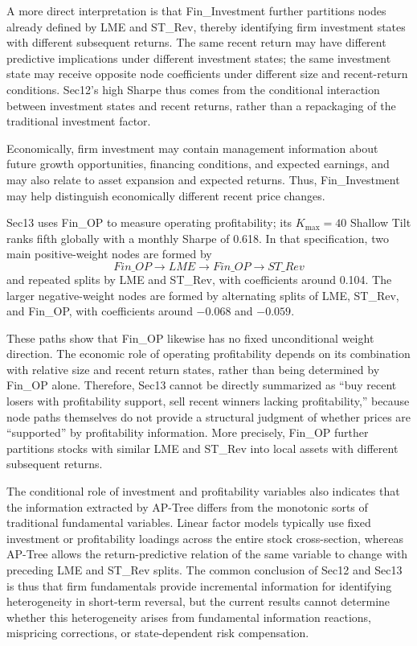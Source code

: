 \documentclass[12pt]{article}
\def\text#1{#1}%
\begin{document}
A more direct interpretation is that Fin\_Investment further partitions nodes already defined by LME and ST\_Rev, thereby identifying firm investment states with different subsequent returns. The same recent return may have different predictive implications under different investment states; the same investment state may receive opposite node coefficients under different size and recent-return conditions. Sec12's high Sharpe thus comes from the conditional interaction between investment states and recent returns, rather than a repackaging of the traditional investment factor.

Economically, firm investment may contain management information about future growth opportunities, financing conditions, and expected earnings, and may also relate to asset expansion and expected returns. Thus, Fin\_Investment may help distinguish economically different recent price changes.

Sec13 uses Fin\_OP to measure operating profitability; its \(K_{\max}=40\) Shallow Tilt ranks fifth globally with a monthly Sharpe of 0.618. In that specification, two main positive-weight nodes are formed by
\[
\text{Fin\_OP}\rightarrow\text{LME}\rightarrow
\text{Fin\_OP}\rightarrow\text{ST\_Rev}
\]
and repeated splits by LME and ST\_Rev, with coefficients around 0.104. The larger negative-weight nodes are formed by alternating splits of LME, ST\_Rev, and Fin\_OP, with coefficients around \(-0.068\) and \(-0.059\).

These paths show that Fin\_OP likewise has no fixed unconditional weight direction. The economic role of operating profitability depends on its combination with relative size and recent return states, rather than being determined by Fin\_OP alone. Therefore, Sec13 cannot be directly summarized as ``buy recent losers with profitability support, sell recent winners lacking profitability,'' because node paths themselves do not provide a structural judgment of whether prices are ``supported'' by profitability information. More precisely, Fin\_OP further partitions stocks with similar LME and ST\_Rev into local assets with different subsequent returns.

The conditional role of investment and profitability variables also indicates that the information extracted by AP-Tree differs from the monotonic sorts of traditional fundamental variables. Linear factor models typically use fixed investment or profitability loadings across the entire stock cross-section, whereas AP-Tree allows the return-predictive relation of the same variable to change with preceding LME and ST\_Rev splits. The common conclusion of Sec12 and Sec13 is thus that firm fundamentals provide incremental information for identifying heterogeneity in short-term reversal, but the current results cannot determine whether this heterogeneity arises from fundamental information reactions, mispricing corrections, or state-dependent risk compensation.
\end{document}
